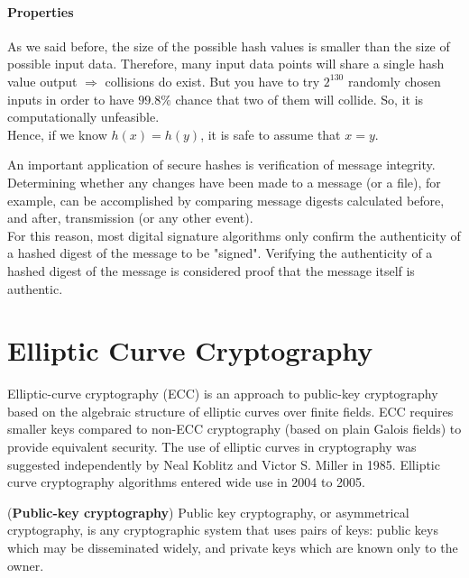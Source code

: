 \paragraph{Properties} 
As we said before, the size of the possible hash values is smaller than the size of possible input data. Therefore, many input data points will share a single hash value output $\Rightarrow$ collisions do exist. But you have to try $2^{130}$ randomly chosen inputs in order to have $99.8 \% $ chance that two of them will collide. So, it is computationally unfeasible.\\
Hence, if we know $h(x) = h(y)$, it is safe to assume that $x= y$.

An important application of secure hashes is verification of message integrity. Determining whether any changes have been made to a message (or a file), for example, can be accomplished by comparing message digests calculated before, and after, transmission (or any other event).\\
For this reason, most digital signature algorithms only confirm the authenticity of a hashed digest of the message to be "signed". Verifying the authenticity of a hashed digest of the message is considered proof that the message itself is authentic.
\section{Elliptic Curve Cryptography}
Elliptic-curve cryptography (ECC) is an approach to public-key cryptography based on the algebraic structure of elliptic curves over finite fields. ECC requires smaller keys compared to non-ECC cryptography (based on plain Galois fields) to provide equivalent security. The use of elliptic curves in cryptography was suggested independently by Neal Koblitz and Victor S. Miller in 1985. Elliptic curve cryptography algorithms entered wide use in 2004 to 2005.
\begin{teorema}{(\textbf{Public-key cryptography})}
	Public key cryptography, or asymmetrical cryptography, is any cryptographic system that uses pairs of keys: public keys which may be disseminated widely, and private keys which are known only to the owner.
\end{teorema}

